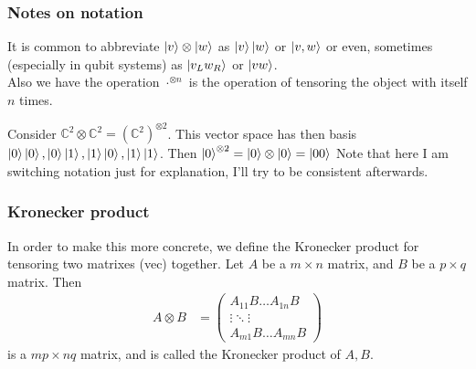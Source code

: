 \documentclass{beamer}
\begin{document}
    \begin{frame}
        \frametitle{Notes on notation}
        It is common to abbreviate $\ket{v} \otimes \ket{w}$ as $\ket{v}\ket{w}$ or $\ket{v, w}$ or even,
        sometimes (especially in qubit systems) as $\ket{v_L w_R}$ or $\ket{v w}$. \\
        Also we have the operation $\cdot^{\otimes n}$ is the operation of tensoring the object with itself $n$ times.
        \begin{example}
            Consider  $\mathbb{C}^2 \otimes \mathbb{C}^2 = (\mathbb{C}^2)^{\otimes 2}$. 
            This vector space has then basis $\ket{0}\ket{0}, \ket{0}\ket{1}, \ket{1}\ket{0}, \ket{1}\ket{1}$.
            Then $\ket{0}^{\otimes 2} = \ket{0} \otimes \ket{0} = \ket{00}$
            Note that here I am switching notation just for explanation, I'll try to be consistent afterwards.
        \end{example}
        

    
    \end{frame}
    \begin{frame}
        \frametitle{Kronecker product}
        In order to make this more concrete, we define the Kronecker product for tensoring two matrixes (vec) together.
        Let $A$ be a $m \times n$ matrix, and $B$ be a $p \times q$ matrix. Then
        \begin{align}
            A \otimes B &= \begin{pmatrix}
                A_{11} B \dots A_{1n} B \\
                \vdots \ddots \vdots  \\
                A_{m1} B \dots A_{mn} B
            \end{pmatrix}
        \end{align}
        is a $mp \times nq$ matrix, and is called the Kronecker product of $A, B$.
    
    \end{frame}
\end{document}
